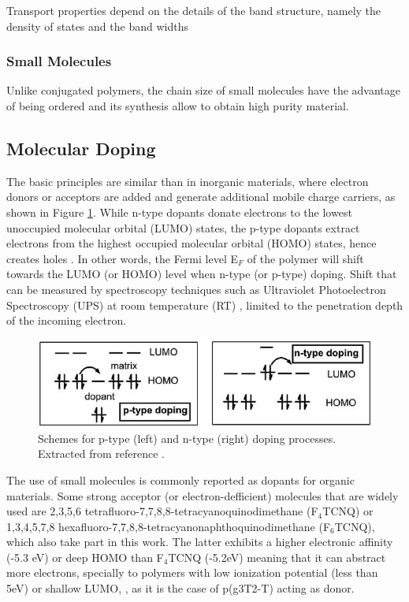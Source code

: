 Transport properties depend on the details of the band structure, namely the density of states and the band widths

\subsubsection{Small Molecules}
Unlike conjugated polymers, the chain size of small molecules have the advantage of being ordered and its synthesis allow to obtain high purity material.

\subsection{Molecular Doping}
The basic principles are similar than in inorganic materials, where electron donors or acceptors are added and generate additional mobile charge carriers, as shown in Figure \ref{fig:doping}. While n-type dopants donate electrons to the lowest unoccupied molecular orbital (LUMO) states, the p-type dopants extract electrons from the highest occupied molecular orbital (HOMO) states, hence creates holes \cite{lussemDopingOrganicSemiconductors2013}. In other words, the Fermi level E$_{F}$ of the polymer will shift towards the LUMO (or HOMO) level when n-type (or p-type) doping. Shift that can be measured by spectroscopy techniques such as Ultraviolet Photoelectron Spectroscopy (UPS) at room temperature (RT) \cite{tietzeFermiLevelShift2012}, limited to the penetration depth of the incoming electron.

\begin{figure}
  \centering
  \includegraphics[width=12cm]{Images/doping.jpg}
  \caption{Schemes for p-type (left) and n-type (right) doping processes. Extracted from reference \cite{lussemDopingOrganicSemiconductors2013}.}
  \label{fig:doping}
\end{figure}

The use of small molecules is commonly reported as dopants for organic materials. Some strong acceptor (or electron-defficient) molecules that are widely used are 2,3,5,6 tetrafluoro-7,7,8,8-tetracyanoquinodimethane (F$_{4}$TCNQ) or 1,3,4,5,7,8 hexafluoro-7,7,8,8-tetracyanonaphthoquinodimethane (F$_{6}$TCNQ), which also take part in this work. The latter exhibits a higher electronic affinity (-5.3 eV) or deep HOMO than F$_{4}$TCNQ (-5.2eV) meaning that it can abstract more electrons, specially to polymers with low ionization potential (less than 5eV) or shallow LUMO, \cite{kieferDoubleDopingConjugated2019}, as it is the case of p(g3T2-T) acting as donor.

